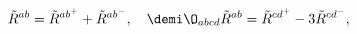 \begin{equation}\label{deco}
\tilde R^{ab}= \tilde R^{ab^+}+ \tilde R^{ab^-}, 
\quad \demi \O_{abcd} \tilde R^{ab}= \tilde R^{cd^+}-3 \tilde R^{cd^-} ,
\end{equation}

